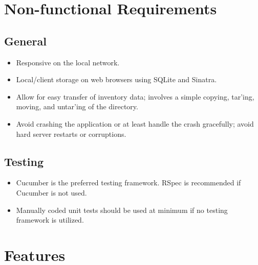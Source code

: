 \documentclass{article}
\begin{document}
\section{Non-functional Requirements}

\subsection{General}
\begin{itemize}
\item Responsive on the local network.
\item Local/client storage on web browsers using SQLite and Sinatra.
\item Allow for easy transfer of inventory data; involves a simple copying, tar'ing, moving, and untar'ing of the directory.
\item Avoid crashing the application or at least handle the crash gracefully; avoid hard server restarts or corruptions.
\end{itemize}

\subsection{Testing}
\begin{itemize}
\item Cucumber is the preferred testing framework. RSpec is recommended if Cucumber is not used.
\item Manually coded unit tests should be used at minimum if no testing framework is utilized.
\end{itemize}

\section{Features}
\end{document}
